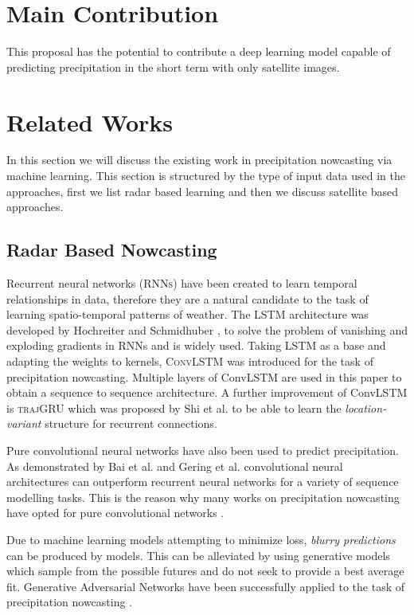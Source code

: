 \documentclass[acmtog, authorversion]{acmart}
\begin{document}
\section{Main Contribution}
This proposal has the potential to contribute a deep learning model capable of predicting precipitation in the short term with only satellite images.

\section{Related Works}

In this section we will discuss the existing work in precipitation nowcasting via machine learning. This section is structured by the type of input data used in the approaches, first we list radar based learning and then we discuss satellite based approaches.

\subsection{Radar Based Nowcasting}

Recurrent neural networks (\textsc{RNNs}) have been created to learn temporal relationships in data, therefore they are a natural candidate to the task of learning spatio-temporal patterns of weather. The \textsc{LSTM} architecture was developed by Hochreiter and Schmidhuber \cite{lstm}, to solve the problem of vanishing and exploding gradients in RNNs and is widely used. Taking LSTM as a base and adapting the weights to kernels, \textsc{ConvLSTM} \cite{convlstm} was introduced for the task of precipitation nowcasting. Multiple layers of ConvLSTM are used in this paper to obtain a sequence to sequence architecture. A further improvement of ConvLSTM is \textsc{trajGRU} which was proposed by Shi et al. \cite{shi2017deep} to be able to learn the \textit{location-variant} structure for recurrent connections.
\medskip

Pure convolutional neural networks have also been used to predict precipitation. As demonstrated by Bai et al. and Gering et al. \cite{bai2018empirical, gehring2017convolutional} convolutional neural architectures can outperform recurrent neural networks for a variety of sequence modelling tasks. This is the reason why many works on precipitation nowcasting have opted for pure convolutional networks \cite{rainet,agrawal2019machine}.
\medskip

Due to machine learning models attempting to minimize loss, \textit{blurry predictions} can be produced by models. This can be alleviated by using generative models which sample from the possible futures and do not seek to provide a best average fit. Generative Adversarial Networks have been successfully applied to the task of precipitation nowcasting \cite{Ravuri_2021}.
\end{document}
